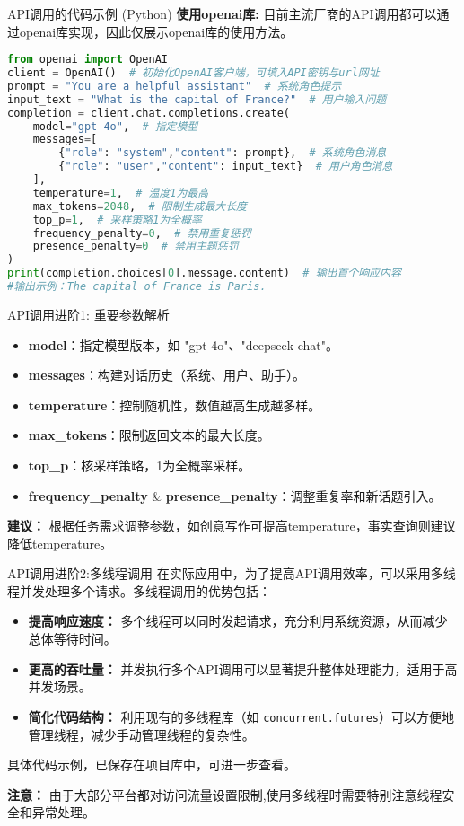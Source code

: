 \documentclass{beamer}
\begin{document}
\begin{frame}[fragile]{API调用的代码示例 (Python)}
    \scriptsize
\textbf{使用openai库:} 目前主流厂商的API调用都可以通过openai库实现，因此仅展示openai库的使用方法。

\begin{lstlisting}[language={Python}]
from openai import OpenAI  
client = OpenAI()  # 初始化OpenAI客户端，可填入API密钥与url网址
prompt = "You are a helpful assistant"  # 系统角色提示
input_text = "What is the capital of France?"  # 用户输入问题
completion = client.chat.completions.create(
    model="gpt-4o",  # 指定模型
    messages=[ 
        {"role": "system","content": prompt},  # 系统角色消息
        {"role": "user","content": input_text}  # 用户角色消息
    ],
    temperature=1,  # 温度1为最高
    max_tokens=2048,  # 限制生成最大长度
    top_p=1,  # 采样策略1为全概率
    frequency_penalty=0,  # 禁用重复惩罚
    presence_penalty=0  # 禁用主题惩罚
)
print(completion.choices[0].message.content)  # 输出首个响应内容
#输出示例：The capital of France is Paris.
\end{lstlisting}
\end{frame}

\begin{frame}[fragile]{API调用进阶1: 重要参数解析}
    \begin{itemize}
        \item \textbf{model}：指定模型版本，如 "gpt-4o"、"deepseek-chat"。
        \item \textbf{messages}：构建对话历史（系统、用户、助手）。
        \item \textbf{temperature}：控制随机性，数值越高生成越多样。
        \item \textbf{max\_tokens}：限制返回文本的最大长度。
        \item \textbf{top\_p}：核采样策略，1为全概率采样。
        \item \textbf{frequency\_penalty} \& \textbf{presence\_penalty}：调整重复率和新话题引入。
    \end{itemize}
    \medskip
    \textbf{建议：} 根据任务需求调整参数，如创意写作可提高temperature，事实查询则建议降低temperature。
\end{frame}

\begin{frame}[fragile]{API调用进阶2:多线程调用}
\small
    在实际应用中，为了提高API调用效率，可以采用多线程并发处理多个请求。多线程调用的优势包括：
    \begin{itemize}
        \item \textbf{提高响应速度：} 多个线程可以同时发起请求，充分利用系统资源，从而减少总体等待时间。
        \item \textbf{更高的吞吐量：} 并发执行多个API调用可以显著提升整体处理能力，适用于高并发场景。
        \item \textbf{简化代码结构：} 利用现有的多线程库（如 \texttt{concurrent.futures}）可以方便地管理线程，减少手动管理线程的复杂性。
    \end{itemize}
    具体代码示例，已保存在项目库中，可进一步查看。

    \textbf{注意：} 由于大部分平台都对访问流量设置限制,使用多线程时需要特别注意线程安全和异常处理。
\end{frame}
\end{document}
